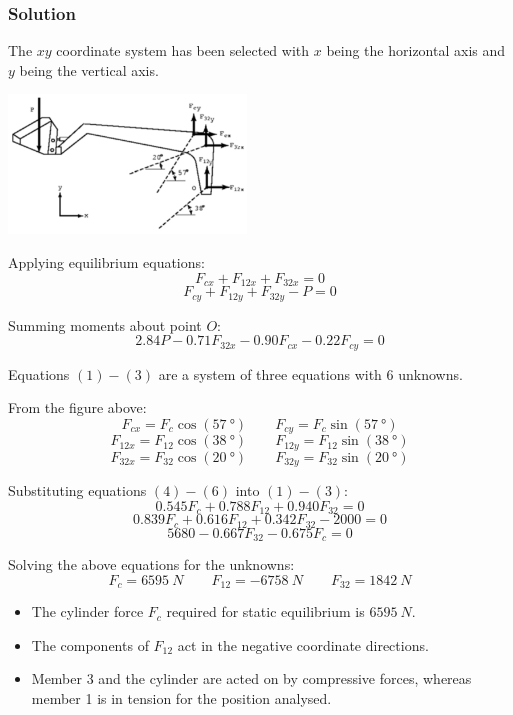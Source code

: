 \documentclass[11pt]{article}
\begin{document}
 \newpage
\subsubsection{Solution}
\label{sec:orge255ff2}
The \(xy\) coordinate system has been selected with \(x\) being the horizontal axis and \(y\) being the vertical axis.  \\

\begin{center}
\includegraphics[height=10em]{./images/sample-problem-front-end-loader-free-body-diagram.png}
\end{center}

Applying equilibrium equations:
\[F_{cx} + F_{12x} + F_{32x} = 0 \tag{1}\]
\[F_{cy} + F_{12y} + F_{32y} - P = 0 \tag{2}\]

Summing moments about point \(O\):
\[2.84P - 0.71F_{32x} - 0.90F_{cx} - 0.22F_{cy} = 0 \tag{3}\]

Equations \((1) - (3)\) are a system of three equations with 6 unknowns.

From the figure above:
\[F_{cx} = F_c \cos (\qty{57}{\degree}) \qquad F_{cy} = F_c \sin (\qty{57}{\degree}) \tag{4}\]
\[F_{12x} = F_{12} \cos (\qty{38}{\degree}) \qquad F_{12y} = F_{12} \sin (\qty{38}{\degree}) \tag{5}\]
\[F_{32x} = F_{32} \cos (\qty{20}{\degree}) \qquad F_{32y} = F_{32} \sin (\qty{20}{\degree}) \tag{6}\]

Substituting equations \((4) - (6)\) into \((1) - (3)\):
\[0.545 F_c + 0.788 F_{12} + 0.940 F_{32} = 0\]
\[0.839 F_c + 0.616 F_{12} + 0.342 F_{32} - 2000 = 0\]
\[5680 - 0.667 F_{32} - 0.675 F_c = 0\]

Solving the above equations for the unknowns:
\[F_c = \qty{6595}{N} \qquad F_{12} = \qty{-6758}{N} \qquad F_{32} = \qty{1842}{N}\]

\begin{itemize}
\item The cylinder force \(F_c\) required for static equilibrium is \(\qty{6595}{N}\).
\item The components of \(F_{12}\) act in the negative coordinate directions.
\item Member 3 and the cylinder are acted on by compressive forces, whereas member 1 is in tension for the position analysed.
\end{itemize}
\end{document}
